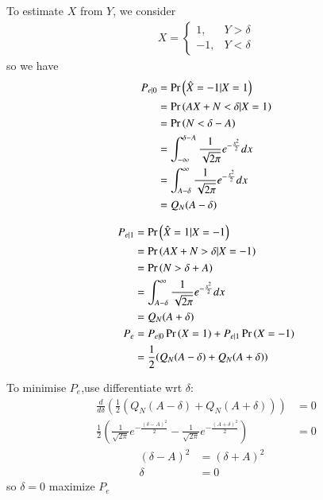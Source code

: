 \documentclass[journal,12pt,twocolumn]{IEEEtran}
\renewcommand\thesection{\arabic{section}}
\begin{document}
\begin{enumerate}[label=\thesection.\arabic*
,ref=\thesection.\theenumi]
\solution
To estimate $X$ from $Y$, we consider
\begin{align*}
    X = 
    \begin{cases}
        1, & Y > \delta \\
        -1, & Y < \delta
    \end{cases}
\end{align*}
so we have
\begin{align*}
P_{e|0} &= \Pr\left(\hat{X} = -1 | X = 1\right) \\
&= \Pr\left(AX+N < \delta | X = 1\right) \\
&= \Pr\left(N < \delta - A\right) \\
&= \int _{-\infty} ^{\delta - A} \frac{1}{\sqrt{2\pi}} e^{-\frac{x^2}{2}} dx \\
&= \int _{A - \delta} ^{\infty} \frac{1}{\sqrt{2\pi}} e^{-\frac{x^2}{2}} dx \\
&= Q_N(A - \delta) \\
\end{align*}

\begin{align*}
P_{e|1} &= \Pr\left(\hat{X} = 1 | X = -1\right) \\
&= \Pr\left(AX+N > \delta | X = -1\right) \\
&= \Pr\left(N > \delta + A\right) \\
&= \int _{A - \delta} ^{\infty} \frac{1}{\sqrt{2\pi}} e^{-\frac{x^2}{2}} dx \\
&= Q_N(A + \delta) \\
P_e &= P_{e|0} \Pr\left(X = 1\right) + P_{e|1} \Pr\left(X = -1\right) \\
&= \frac{1}{2}(Q_N(A - \delta) + Q_N(A + \delta)) \\
\end{align*}

To minimise $P_e$,use differentiate wrt $\delta$:
\begin{align*}
 \frac{d}{d\delta} \left(\frac{1}{2}(Q_N(A - \delta) + Q_N(A + \delta))\right) &= 0\\
 \frac{1}{2} (\frac{1}{\sqrt{2\pi}} e^{-\frac{(\delta - A)^2}{2}} - \frac{1}{\sqrt{2\pi}} e^{-\frac{(A + \delta)^2}{2}} ) &= 0
\end{align*}
\begin{align*}
(\delta - A)^2 &= (\delta + A)^2& \\
\delta &= 0 
\end{align*}
so $\delta = 0$ maximize $P_e$


\end{enumerate}
\end{document}
